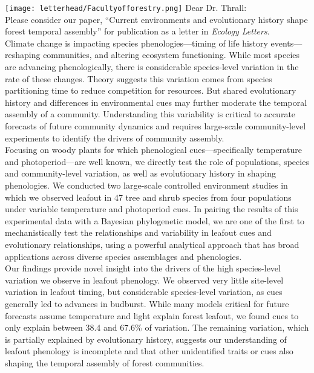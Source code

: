 \documentclass[11pt,a4paper]{article}
\begin{document}

\noindent \texttt{[image: letterhead/Facultyofforestry.png]}
\noindent Dear Dr. Thrall:
\vspace{1.5ex}\\
\noindent Please consider our paper, ``Current environments and evolutionary history shape forest temporal assembly'' for publication as a letter in \emph{Ecology Letters}. 
\vspace{1.5ex}\\ 
\noindent Climate change is impacting species phenologies---timing of life history events---reshaping communities, and altering ecosystem functioning. While most species are advancing phenologically, there is considerable species-level variation in the rate of these changes. Theory suggests this variation comes from species partitioning time to reduce competition for resources. But shared evolutionary history and differences in environmental cues may further moderate the temporal assembly of a community. Understanding this variability is critical to accurate forecasts of future community dynamics and requires large-scale community-level experiments to identify the drivers of community assembly.
\vspace{1.5ex}\\
\noindent Focusing on woody plants for which phenological cues---specifically temperature and photoperiod---are well known, we directly test the role of populations, species and community-level variation, as well as evolutionary history in shaping phenologies. We conducted two large-scale controlled environment studies in which we observed leafout in 47 tree and shrub species from four populations under variable temperature and photoperiod cues. In pairing the results of this experimental data with a Bayesian phylogenetic model, we are one of the first to mechanistically test the relationships and variability in leafout cues and evolutionary relationships, using a powerful analytical approach that has broad applications across diverse species assemblages and phenologies.
\vspace{1.5ex}\\
\noindent  Our findings provide novel insight into the drivers of the high species-level variation we observe in leafout phenology. We observed very little site-level variation in leafout timing, but considerable species-level variation, as cues generally led to advances in budburst.  While many models critical for future forecasts assume temperature and light explain forest leafout, we found cues to only explain between 38.4 and 67.6\% of variation. The remaining variation, which is partially explained by evolutionary history, suggests our understanding of leafout phenology is incomplete and that other unidentified traits or cues also shaping the temporal assembly of forest communities. 
\end{document}
